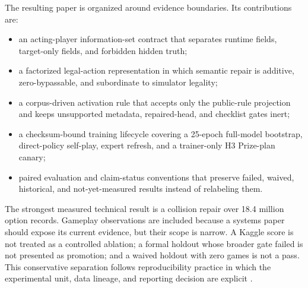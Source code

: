 The resulting paper is organized around evidence boundaries. Its contributions
are:

\begin{itemize}
\item an acting-player information-set contract that separates runtime fields,
target-only fields, and forbidden hidden truth;
\item a factorized legal-action representation in which semantic repair is
additive, zero-bypassable, and subordinate to simulator legality;
\item a corpus-driven activation rule that accepts only the public-rule
projection and keeps unsupported metadata, repaired-head, and checklist gates
inert;
\item a checksum-bound training lifecycle covering a 25-epoch full-model
bootstrap, direct-policy self-play, expert refresh, and a trainer-only H3
Prize-plan canary;
\item paired evaluation and claim-status conventions that preserve failed,
waived, historical, and not-yet-measured results instead of relabeling them.
\end{itemize}

The strongest measured technical result is a collision repair over 18.4 million
option records. Gameplay observations are included because a systems paper
should expose its current evidence, but their scope is narrow. A Kaggle score is
not treated as a controlled ablation; a formal holdout whose broader gate failed
is not presented as promotion; and a waived holdout with zero games is not a
pass. This conservative separation follows reproducibility practice in which
the experimental unit, data lineage, and reporting decision are explicit
\cite{pineau2021improving}.
